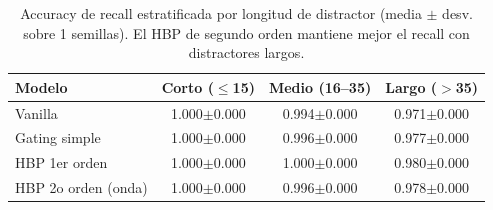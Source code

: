 \begin{table}[t]
\centering
\caption{Accuracy de recall estratificada por longitud de distractor (media $\pm$ desv. sobre 1 semillas). El HBP de segundo orden mantiene mejor el recall con distractores largos.}
\label{tab:main}
\begin{tabular}{lccc}
\toprule
Modelo & Corto ($\leq$15) & Medio (16--35) & Largo ($>$35) \\
\midrule
Vanilla & 1.000$\pm$0.000 & 0.994$\pm$0.000 & 0.971$\pm$0.000 \\
Gating simple & 1.000$\pm$0.000 & 0.996$\pm$0.000 & 0.977$\pm$0.000 \\
HBP 1er orden & 1.000$\pm$0.000 & 1.000$\pm$0.000 & 0.980$\pm$0.000 \\
HBP 2o orden (onda) & 1.000$\pm$0.000 & 0.996$\pm$0.000 & 0.978$\pm$0.000 \\
\bottomrule
\end{tabular}
\end{table}